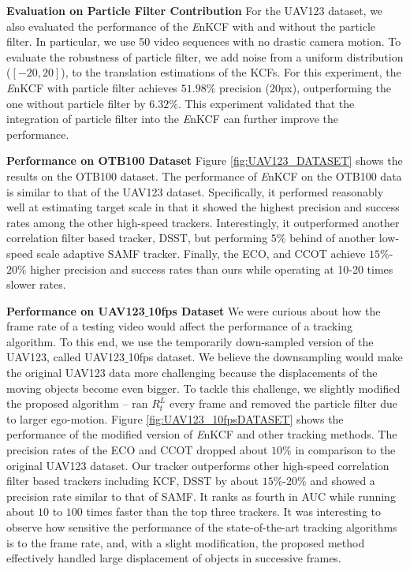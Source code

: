 \documentclass[10pt,twocolumn,letterpaper]{article}
\begin{document}
\textbf{Evaluation on Particle Filter Contribution} For the UAV123
dataset, we also evaluated the performance of the {\it E}nKCF with and
without the particle filter. In particular, we use 50 video sequences
with no drastic camera motion. To evaluate the robustness of particle
filter, we add noise from a uniform distribution ($[-20,20]$), to the
translation estimations of the KCFs. For this experiment, the {\it
  E}nKCF with particle filter achieves $51.98\%$ precision ($20$px),
outperforming the one without particle filter by $6.32\%$. This
experiment validated that the integration of particle filter into the
{\it E}nKCF can further improve the performance.

\textbf{Performance on OTB100 Dataset} Figure \ref{fig:UAV123_DATASET}
shows the results on the OTB100 dataset. The performance of {\it
  E}nKCF on the OTB100 data is similar to that of the UAV123
dataset. Specifically, it performed reasonably well at estimating
target scale in that it showed the highest precision and success rates
among the other high-speed trackers. Interestingly, it outperformed
another correlation filter based tracker, DSST, but performing $5\%$
behind of another low-speed scale adaptive SAMF tracker. Finally, the
ECO, and CCOT achieve $15\%$-$20\%$ higher precision and success rates
than ours while operating at 10-20 times slower rates.

\textbf{Performance on UAV123$\_$10fps Dataset} We were curious about
how the frame rate of a testing video would affect the performance of
a tracking algorithm. To this end, we use the temporarily down-sampled
version of the UAV123, called UAV123$\_$10fps dataset. We believe the
downsampling would make the original UAV123 data more challenging
because the displacements of the moving objects become even bigger. To
tackle this challenge, we slightly modified the proposed algorithm --
ran $R_{t}^{L}$ every frame and removed the particle filter due to
larger ego-motion. Figure \ref{fig:UAV123_10fpsDATASET} shows the
performance of the modified version of {\it E}nKCF and other tracking
methods. The precision rates of the ECO and CCOT dropped about $10\%$
in comparison to the original UAV123 dataset. Our tracker outperforms
other high-speed correlation filter based trackers including KCF, DSST
by about $15\%$-$20\%$ and showed a precision rate similar to that of
SAMF. It ranks as fourth in AUC while running about $10$ to $100$
times faster than the top three trackers. It was interesting to
observe how sensitive the performance of the state-of-the-art tracking
algorithms is to the frame rate, and, with a slight modification, the
proposed method effectively handled large displacement of objects in
successive frames.
\end{document}
